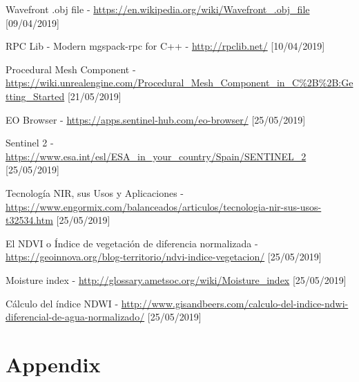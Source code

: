 \documentclass[10pt,a4paper,twocolumn,twoside]{article}
\begin{document}
\begin{thebibliography}{11}
Wavefront .obj file - \url{https://en.wikipedia.org/wiki/Wavefront_.obj_file} [09/04/2019]

RPC Lib - Modern mgspack-rpc for C++ - \url{http://rpclib.net/} [10/04/2019]

Procedural Mesh Component - \url{https://wiki.unrealengine.com/Procedural_Mesh_Component_in_C%2B%2B:Getting_Started} [21/05/2019]

EO Browser - \url{https://apps.sentinel-hub.com/eo-browser/} [25/05/2019]

Sentinel 2 - \url{https://www.esa.int/esl/ESA_in_your_country/Spain/SENTINEL_2} [25/05/2019]

Tecnología NIR, sus Usos y Aplicaciones - \url{https://www.engormix.com/balanceados/articulos/tecnologia-nir-sus-usos-t32534.htm} [25/05/2019]

El NDVI o Índice de vegetación de diferencia normalizada - \url{https://geoinnova.org/blog-territorio/ndvi-indice-vegetacion/} [25/05/2019]

Moisture index - \url{http://glossary.ametsoc.org/wiki/Moisture_index} [25/05/2019]

Cálculo del índice NDWI - \url{http://www.gisandbeers.com/calculo-del-indice-ndwi-diferencial-de-agua-normalizado/} [25/05/2019]

\end{thebibliography}

\newpage
\appendix
\section*{Appendix}

\setcounter{section}{1}
\end{document}

